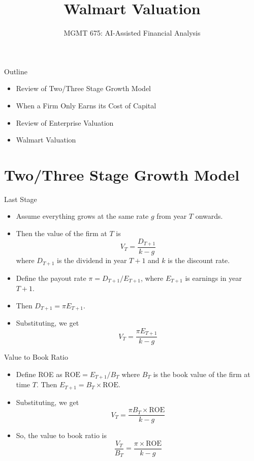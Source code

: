 \documentclass[10pt]{beamer}
\title{Walmart Valuation}
\subtitle{MGMT 675: AI-Assisted Financial Analysis}
\date{}
\begin{document}
\begin{frame}[plain]
\titlepage
\end{frame}

\begin{frame}{Outline}
  \begin{itemize}
    \item Review of Two/Three Stage Growth Model
    \item When a Firm Only Earns its Cost of Capital
    \item Review of Enterprise Valuation
    \item Walmart Valuation
  \end{itemize}
\end{frame}

\section{Two/Three Stage Growth Model}

\begin{frame}{Last Stage}
    \begin{itemize}
    \item Assume everything grows at the same rate $g$ from year $T$ onwards.
    \item Then the value of the firm at $T$ is
    \[
        V_T = \frac{D_{T+1}}{k - g}
    \]
    where $D_{T+1}$ is the dividend in year $T+1$ and $k$ is the discount rate.
    \item Define the payout rate $\pi = D_{T+1}/E_{T+1}$, where $E_{T+1}$ is earnings in year $T+1$.
    \item Then $D_{T+1} = \pi E_{T+1}$.
    \item Substituting, we get
    \[
        V_T = \frac{\pi E_{T+1}}{k - g}
    \]
    \end{itemize}
\end{frame}

    \begin{frame}{Value to Book Ratio}
        \begin{itemize}
    \item Define ROE as $\text{ROE} = E_{T+1}/B_T$ where $B_T$ is the book value of the firm at time $T$. Then $E_{T+1} = B_T \times \text{ROE}$.
    \item Substituting, we get
    \[
        V_T = \frac{\pi B_T \times \text{ROE}}{k - g}
    \]
    \item So, the value to book ratio is 
    $$\frac{V_T}{B_T} = \frac{\pi \times \text{ROE}}{k - g}$$
        \end{itemize}
      \end{frame}
\end{document}
